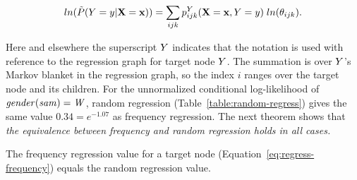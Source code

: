\documentclass[twoside,leqno,twocolumn]{article}
\begin{document}
\begin{equation} \label{eq:regress-frequency}
ln(\tilde{P}(Y = y|\mathbf{X}=\mathbf{x})) = \sum_{ijk} p^{Y}_{ijk}(\mathbf{X}=\mathbf{x},Y = y) \; ln(\theta_{ijk}).
\end{equation}

Here and elsewhere the superscript $Y$ indicates that the notation is used with reference to the regression graph for target node $Y$. The summation is over $Y$'s Markov blanket in the regression graph, so the index $i$ ranges over the target node and its children. 
%
For the unnormalized conditional log-likelihood of $\it{gender}(sam) = W$, random regression (Table~\ref{table:random-regress}) gives the same value $0.34 = e^{-1.07}$ as frequency regression.
The next theorem shows that {\em the  equivalence between frequency and random regression holds in all cases.}  
\begin{theorem} \label{prop:randomize}
The frequency regression value  for a target node (Equation~\eqref{eq:regress-frequency}) equals the random regression value. 
\end{theorem}


%



\end{document}
